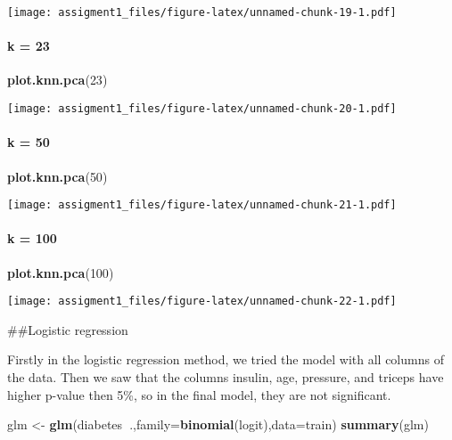\documentclass[
]{article}
\newenvironment{Shaded}{\begin{snugshade}}{\end{snugshade}}
\newcommand{\DataTypeTok}[1]{\textcolor[rgb]{0.13,0.29,0.53}{#1}}
\newcommand{\DecValTok}[1]{\textcolor[rgb]{0.00,0.00,0.81}{#1}}
\newcommand{\KeywordTok}[1]{\textcolor[rgb]{0.13,0.29,0.53}{\textbf{#1}}}
\newcommand{\NormalTok}[1]{#1}
\newcommand{\OperatorTok}[1]{\textcolor[rgb]{0.81,0.36,0.00}{\textbf{#1}}}
\newcommand{\StringTok}[1]{\textcolor[rgb]{0.31,0.60,0.02}{#1}}
\begin{document}
\texttt{[image: assigment1\_files/figure-latex/unnamed-chunk-19-1.pdf]}

\hypertarget{k-23}{%
\paragraph{k = 23}\label{k-23}}

\begin{Shaded}
\begin{Highlighting}[]
\KeywordTok{plot.knn.pca}\NormalTok{(}\DecValTok{23}\NormalTok{)}
\end{Highlighting}
\end{Shaded}

\texttt{[image: assigment1\_files/figure-latex/unnamed-chunk-20-1.pdf]}

\hypertarget{k-50}{%
\paragraph{k = 50}\label{k-50}}

\begin{Shaded}
\begin{Highlighting}[]
\KeywordTok{plot.knn.pca}\NormalTok{(}\DecValTok{50}\NormalTok{)}
\end{Highlighting}
\end{Shaded}

\texttt{[image: assigment1\_files/figure-latex/unnamed-chunk-21-1.pdf]}

\hypertarget{k-100}{%
\paragraph{k = 100}\label{k-100}}

\begin{Shaded}
\begin{Highlighting}[]
\KeywordTok{plot.knn.pca}\NormalTok{(}\DecValTok{100}\NormalTok{)}
\end{Highlighting}
\end{Shaded}

\texttt{[image: assigment1\_files/figure-latex/unnamed-chunk-22-1.pdf]}

\#\#Logistic regression

Firstly in the logistic regression method, we tried the model with all
columns of the data. Then we saw that the columns insulin, age,
pressure, and triceps have higher p-value then 5\%, so in the final
model, they are not significant.

\begin{Shaded}
\begin{Highlighting}[]
\NormalTok{glm <-}\StringTok{ }\KeywordTok{glm}\NormalTok{(diabetes}\OperatorTok{~}\NormalTok{.,}\DataTypeTok{family=}\KeywordTok{binomial}\NormalTok{(logit),}\DataTypeTok{data=}\NormalTok{train)}
\KeywordTok{summary}\NormalTok{(glm)}
\end{Highlighting}
\end{Shaded}
\end{document}
